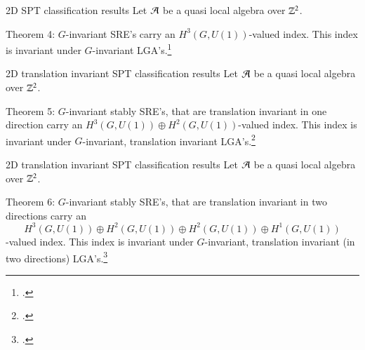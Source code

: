 \documentclass{beamer}
\begin{document}
\begin{frame}{2D SPT classification results}
Let $\AA$ be a quasi local algebra over $\ZZ^2$.
\begin{block}{Theorem 4:}
$G$-invariant SRE's carry an $H^3(G,U(1))$-valued index. This index is invariant under $G$-invariant LGA's.\footcite{ogata2021h3gmathbb}
\end{block}
\end{frame}

\begin{frame}{2D translation invariant SPT classification results}
Let $\AA$ be a quasi local algebra over $\ZZ^2$.
\begin{block}{Theorem 5:}
$G$-invariant stably SRE's, that are translation invariant in one direction carry an $H^3(G,U(1))\oplus H^2(G,U(1))$-valued index. This index is invariant under $G$-invariant, translation invariant LGA's.\footcite{https://doi.org/10.48550/arxiv.2202.11758}
\end{block}
\end{frame}

\begin{frame}{2D translation invariant SPT classification results}
Let $\AA$ be a quasi local algebra over $\ZZ^2$.
\begin{block}{Theorem 6:}
$G$-invariant stably SRE's, that are translation invariant in two directions carry an
\[H^3(G,U(1))\oplus H^2(G,U(1))\oplus H^2(G,U(1))\oplus H^1(G,U(1))\]
-valued index. This index is invariant under $G$-invariant, translation invariant (in two directions) LGA's.\footcite{https://doi.org/10.48550/arxiv.2202.11758}
\end{block}
\end{frame}
\end{document}

